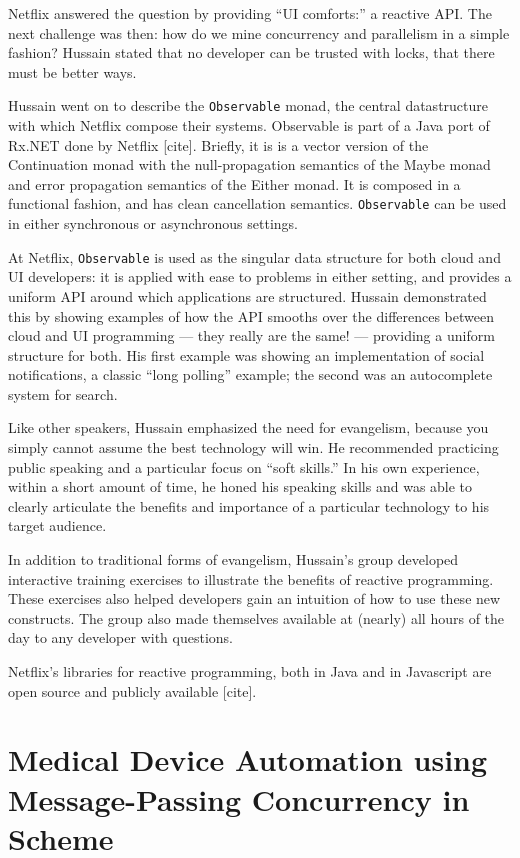 \documentclass{jfp1}
\newcommand\needcite{{\color{red} [cite]}\xspace}
\begin{document}
Netflix answered the question by providing ``UI comforts:'' a reactive
API. The next challenge was then: how do we mine concurrency and
parallelism in a simple fashion? Hussain stated that no developer can
be trusted with locks, that there must be better ways.

Hussain went on to describe the \texttt{Observable} monad, the central
datastructure with which Netflix compose their systems. Observable is
part of a Java port of Rx.NET done by Netflix\needcite. Briefly, it is is a vector version of
the Continuation monad with the null-propagation semantics of the
Maybe monad and error propagation semantics of the Either monad. It
is composed in a functional fashion, and has clean cancellation
semantics. \texttt{Observable} can be used in either synchronous or
asynchronous settings.

At Netflix, \texttt{Observable} is used as the singular data structure
for both cloud and UI developers: it is applied with ease to problems
in either setting, and provides a uniform API around which
applications are structured. Hussain demonstrated this by showing
examples of how the API smooths over the differences between cloud
and UI programming --- they really are the same! --- providing a
uniform structure for both. His first example was showing an
implementation of social notifications, a classic ``long polling''
example; the second was an autocomplete system for search.

Like other speakers, Hussain emphasized the need for evangelism,
because you simply cannot assume the best technology will win.
He recommended practicing public speaking and a particular focus
on ``soft skills.'' In his own experience, within a short amount of time,
he honed his speaking skills and was able to clearly articulate the
benefits and importance of a particular technology to his target 
audience.

In addition to traditional forms of evangelism, Hussain's group
developed interactive training exercises to illustrate the benefits
of reactive programming. These exercises also helped developers gain
an intuition of how to use these new constructs. The group  also made
themselves available at (nearly) all hours of the day to any developer
with questions.

Netflix's libraries for reactive programming, both in Java and in 
Javascript are open source and publicly available\needcite.

\section{Medical Device Automation using Message-Passing 
Concurrency in Scheme}
\end{document}
